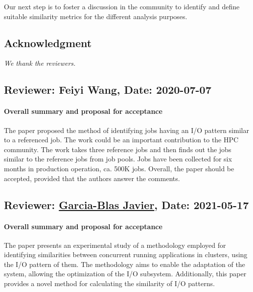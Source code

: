 \documentclass{jhps}
\begin{document}
Our next step is to foster a discussion in the community to identify and define suitable similarity metrics for the different analysis purposes.



\subsection*{Acknowledgment} %
\textit{We thank the reviewers.}





\reviews   %

\subsection*{Reviewer: Feiyi Wang, Date: 2020-07-07}

\paragraph{Overall summary and proposal for acceptance}

The paper proposed the method of identifying jobs having an I/O pattern similar to a referenced job. The work could be an important contribution to the HPC community. The work takes three reference jobs and then finds out the jobs similar to the reference jobs from job pools. Jobs have been collected for six months in production operation, ca. 500K jobs.
Overall, the paper should be accepted, provided that the authors answer the comments.




\subsection*{Reviewer: \href{https://www.arcos.inf.uc3m.es/fjblas/}{Garcia-Blas Javier}, Date: 2021-05-17}

\paragraph{Overall summary and proposal for acceptance}

The paper presents an experimental study of a methodology employed for identifying similarities between concurrent running applications in clusters, using the I/O pattern of them. The methodology aims to enable the adaptation of the system, allowing the optimization of the I/O subsystem. Additionally, this paper provides a novel method for calculating the similarity of I/O patterns.
\end{document}
